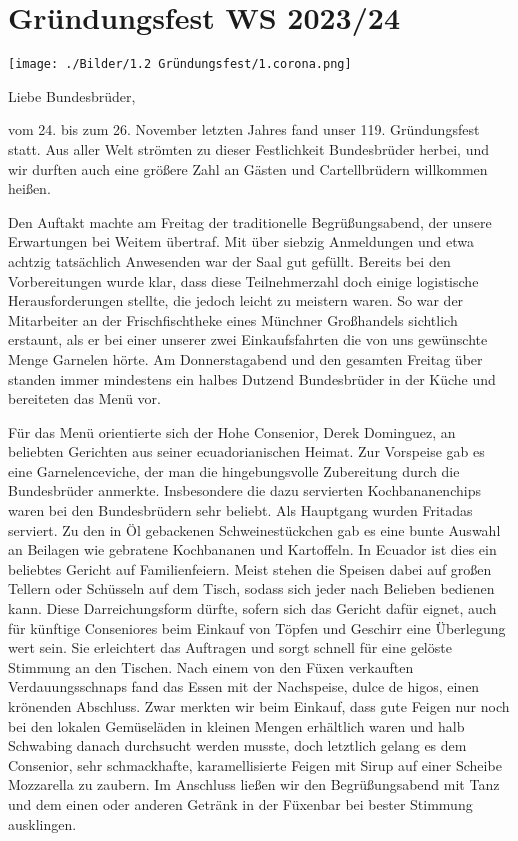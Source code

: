 \section{Gründungsfest WS 2023/24}


\begin{figurehere}
		\begin{center}
			\texttt{[image: ./Bilder/1.2 Gründungsfest/1.corona.png]} 
		\end{center}
	\end{figurehere}
	
\begin{multicols}{2}
Liebe Bundesbrüder,

vom 24. bis zum 26. November letzten Jahres fand unser 119. Gründungsfest statt. Aus aller Welt strömten zu dieser Festlichkeit Bundesbrüder herbei, und wir durften auch eine größere Zahl an Gästen und Cartellbrüdern willkommen heißen.

Den Auftakt machte am Freitag der traditionelle Begrüßungsabend, der unsere Erwartungen bei Weitem übertraf. Mit über siebzig Anmeldungen und etwa achtzig tatsächlich Anwesenden war der Saal gut gefüllt. Bereits bei den Vorbereitungen wurde klar, dass diese Teilnehmerzahl doch einige logistische Herausforderungen stellte, die jedoch leicht zu meistern waren. So war der Mitarbeiter an der Frischfischtheke eines Münchner Großhandels sichtlich erstaunt, als er bei einer unserer zwei Einkaufsfahrten die von uns gewünschte Menge Garnelen hörte. Am Donnerstagabend und den gesamten Freitag über standen immer mindestens ein halbes Dutzend Bundesbrüder in der Küche und bereiteten das Menü vor.

Für das Menü orientierte sich der Hohe Consenior, Derek Dominguez, an beliebten Gerichten aus seiner ecuadorianischen Heimat. Zur Vorspeise gab es eine Garnelenceviche, der man die hingebungsvolle Zubereitung durch die Bundesbrüder anmerkte. Insbesondere die dazu servierten Kochbananenchips waren bei den Bundesbrüdern sehr beliebt. Als Hauptgang wurden Fritadas serviert. Zu den in Öl gebackenen Schweinestückchen gab es eine bunte Auswahl an Beilagen wie gebratene Kochbananen und Kartoffeln. In Ecuador ist dies ein beliebtes Gericht auf Familienfeiern. Meist stehen die Speisen dabei auf großen Tellern oder Schüsseln auf dem Tisch, sodass sich jeder nach Belieben bedienen kann. Diese Darreichungsform dürfte, sofern sich das Gericht dafür eignet, auch für künftige Conseniores beim Einkauf von Töpfen und Geschirr eine Überlegung wert sein. Sie erleichtert das Auftragen und sorgt schnell für eine gelöste Stimmung an den Tischen. Nach einem von den Füxen verkauften Verdauungsschnaps fand das Essen mit der Nachspeise, dulce de higos, einen krönenden Abschluss. Zwar merkten wir beim Einkauf, dass gute Feigen nur noch bei den lokalen Gemüseläden in kleinen Mengen erhältlich waren und halb Schwabing danach durchsucht werden musste, doch letztlich gelang es dem Consenior, sehr schmackhafte, karamellisierte Feigen mit Sirup auf einer Scheibe Mozzarella zu zaubern. Im Anschluss ließen wir den Begrüßungsabend mit Tanz und dem einen oder anderen Getränk in der Füxenbar bei bester Stimmung ausklingen.


\end{multicols}
